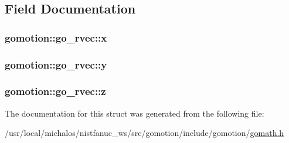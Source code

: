 \subsection{Field Documentation}
\hypertarget{structgomotion_1_1go__rvec_ae29a06bf1a12fc0d321442026f513117}{
\subsubsection[{x}]{ gomotion\-::go\-\_\-rvec\-::x}}\label{structgomotion_1_1go__rvec_ae29a06bf1a12fc0d321442026f513117}
\hypertarget{structgomotion_1_1go__rvec_a5f560402a28bd1cf2ced1cdd627e8e30}{
\subsubsection[{y}]{ gomotion\-::go\-\_\-rvec\-::y}}\label{structgomotion_1_1go__rvec_a5f560402a28bd1cf2ced1cdd627e8e30}
\hypertarget{structgomotion_1_1go__rvec_a47712173e216ec298c4d58af0abfb100}{
\subsubsection[{z}]{ gomotion\-::go\-\_\-rvec\-::z}}\label{structgomotion_1_1go__rvec_a47712173e216ec298c4d58af0abfb100}


The documentation for this struct was generated from the following file\-:\begin{DoxyCompactItemize}
\item 
/usr/local/michalos/nistfanuc\-\_\-ws/src/gomotion/include/gomotion/\hyperlink{gomath_8h}{gomath.\-h}\end{DoxyCompactItemize}
